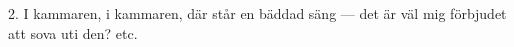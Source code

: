 2.  I kammaren, i kammaren, där står en bäddad säng —
    det är väl mig förbjudet att sova uti den? etc.
